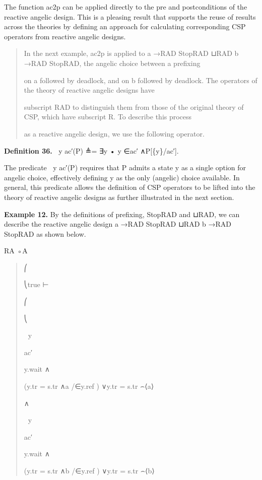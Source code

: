 \documentclass[11pt]{article}
\begin{document}
The function ac2p can be applied directly to the pre and postconditions of the reactive angelic design. This is a pleasing result that supports the reuse of results across the theories by defining an approach for calculating corresponding CSP operators from reactive angelic designs.

\begin{quote}\small\raggedright
In the next example, ac2p is applied to a →RAD StopRAD ⊔RAD b →RAD StopRAD, the angelic choice between a prefixing
\par
on a followed by deadlock, and on b followed by deadlock. The operators of the theory of reactive angelic designs have
\par
subscript RAD to distinguish them from those of the original theory of CSP, which have subscript R. To describe this process
\par
as a reactive angelic design, we use the following operator.
\end{quote}

\noindent\textbf{Definition 36.} ∈⃝y ac′(P) ≜= ∃y • y ∈ac′ ∧P[\{y\}/ac′].


The predicate ∈⃝y ac′(P) requires that P admits a state y as a single option for angelic choice, effectively defining y as the only (angelic) choice available. In general, this predicate allows the definition of CSP operators to be lifted into the theory of reactive angelic designs as further illustrated in the next section.

\noindent\textbf{Example 12.} By the definitions of prefixing, StopRAD and ⊔RAD, we can describe the reactive angelic design a →RAD StopRAD ⊔RAD b →RAD StopRAD as shown below.


RA ◦A

\begin{quote}\small\raggedright
⎛
\par
⎝true ⊢
\par
⎛
\par
⎝
\par
∈⃝y
\par
ac′
\par
y.wait ∧
\par
(y.tr = s.tr ∧a /∈y.ref ) ∨y.tr = s.tr ⌢⟨a⟩
\par
∧
\par
∈⃝y
\par
ac′
\par
y.wait ∧
\par
(y.tr = s.tr ∧b /∈y.ref ) ∨y.tr = s.tr ⌢⟨b⟩
\end{quote}
\end{document}
